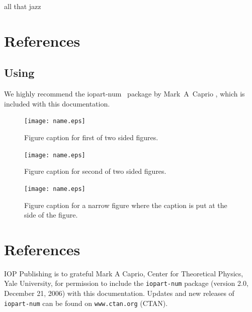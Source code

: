 \documentclass[a4paper]{jpconf}
\begin{document}
all that jazz



\section{References}

\subsection{Using \BibTeX}
We highly recommend the {\ttfamily\textbf\selectfont iopart-num} \BibTeX\ package by Mark~A~Caprio \cite{iopartnum}, which is included with this documentation.


\begin{figure}[h]
\begin{minipage}{14pc}
\texttt{[image: name.eps]}
\caption{\label{label}Figure caption for first of two sided figures.}
\end{minipage}\hspace{2pc}%
\begin{minipage}{14pc}
\texttt{[image: name.eps]}
\caption{\label{label}Figure caption for second of two sided figures.}
\end{minipage} 
\end{figure}

\begin{figure}[h]
\texttt{[image: name.eps]}\hspace{2pc}%
\begin{minipage}[b]{14pc}\caption{\label{label}Figure caption for a narrow figure where the caption is put at the side of the figure.}
\end{minipage}
\end{figure}


\section*{References}
\begin{thebibliography}{9}
 IOP Publishing is to grateful Mark A Caprio, Center for Theoretical Physics, Yale University, for permission to include the {\tt iopart-num} \BibTeX package (version 2.0, December 21, 2006) with  this documentation. Updates and new releases of {\tt iopart-num} can be found on \verb"www.ctan.org" (CTAN). 
\end{thebibliography}
\end{document}
